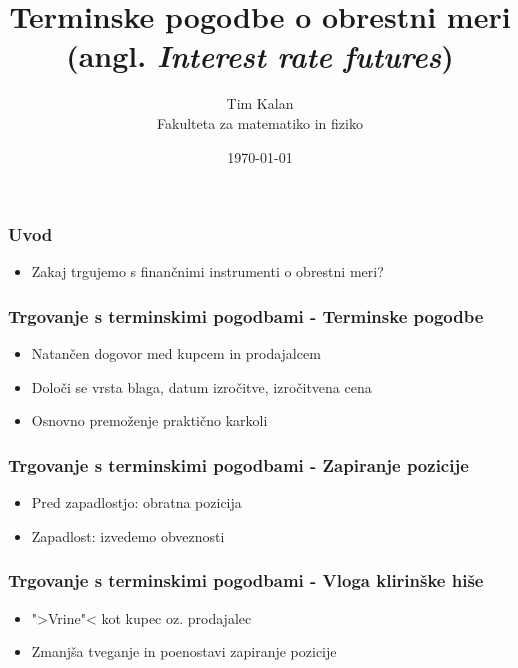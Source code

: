 \documentclass[14pt]{beamer}
\author{Tim Kalan \\ 
    Fakulteta za matematiko in fiziko}
\title{
    Terminske pogodbe o obrestni meri \\ 
    \large (angl. \textit{Interest rate futures})}
\date{\today}
\begin{document}
\begin{frame}
    \titlepage
\end{frame}


\begin{frame}
    \frametitle{Uvod}

    \begin{itemize}
        \item Zakaj trgujemo s finančnimi instrumenti o obrestni meri?
    \end{itemize}


\end{frame}




\begin{frame}
    \frametitle{Trgovanje s terminskimi pogodbami - Terminske pogodbe}
    
    \begin{itemize}
        \item Natančen dogovor med kupcem in prodajalcem
        \item Določi se vrsta blaga, datum izročitve, izročitvena cena
        \item Osnovno premoženje praktično karkoli 
    \end{itemize}


\end{frame}


\begin{frame}
    \frametitle{Trgovanje s terminskimi pogodbami - Zapiranje pozicije}
    
    \begin{itemize}
        \item Pred zapadlostjo: obratna pozicija
        \item Zapadlost: izvedemo obveznosti
    \end{itemize}


\end{frame}


\begin{frame}
    \frametitle{Trgovanje s terminskimi pogodbami - Vloga klirinške hiše}
    
    \begin{itemize}
        \item ">Vrine"< kot kupec oz. prodajalec
        \item Zmanjša tveganje in poenostavi zapiranje pozicije
    \end{itemize}


\end{frame}
\end{document}
